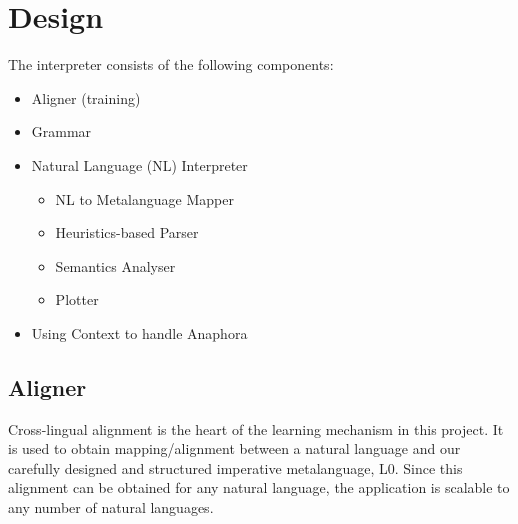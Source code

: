 \def\DevnagVersion{2.15}\documentclass[12pt]{article}
\begin{document}
% 
% 
% 
% 

\section{Design}
The interpreter consists of the following components:
\begin{itemize}
\item Aligner (training)
\item Grammar
\item Natural Language (NL) Interpreter
  \begin{itemize}
    \item NL to Metalanguage Mapper
    \item Heuristics-based Parser
    \item Semantics Analyser
    \item Plotter  
  \end{itemize}
\item Using Context to handle Anaphora
\end{itemize}

\subsection{Aligner}
Cross-lingual alignment is the heart of the learning mechanism in this project. It is used to obtain mapping/alignment between a natural language and our carefully designed and structured imperative metalanguage, L0. Since this alignment can be obtained for any natural language, the application is scalable to any number of natural languages.\\
\end{document}

